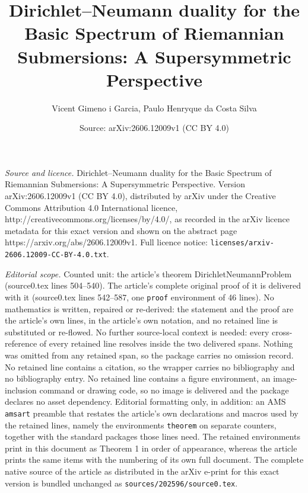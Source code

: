 \documentclass[10pt,a4paper]{amsart}
\title{Dirichlet--Neumann duality for the Basic Spectrum of Riemannian Submersions: A Supersymmetric Perspective}
\author{Vicent Gimeno i Garcia, Paulo Henryque da Costa Silva}
\date{Source: arXiv:2606.12009v1 (CC BY 4.0)}
\begin{document}
\maketitle

\noindent\emph{Source and licence.} Dirichlet--Neumann duality for the Basic Spectrum of Riemannian Submersions: A Supersymmetric Perspective. Version arXiv:2606.12009v1 (CC BY 4.0), distributed by arXiv under the Creative Commons Attribution 4.0 International licence, http://creativecommons.org/licenses/by/4.0/, as recorded in the arXiv licence metadata for this exact version and shown on the abstract page https://arxiv.org/abs/2606.12009v1. Full licence notice: \texttt{licenses/arxiv-2606.12009-CC-BY-4.0.txt}.\par\smallskip

\noindent\textit{Editorial scope.} Counted unit: the article's theorem DirichletNeumannProblem (source0.tex lines 504--540). The article's complete original proof of it is delivered with it (source0.tex lines 542--587, one \texttt{proof} environment of 46 lines). No mathematics is written, repaired or re-derived: the statement and the proof are the article's own lines, in the article's own notation, and no retained line is substituted or re-flowed.  No further source-local context is needed: every cross-reference of every retained line resolves inside the two delivered spans.  Nothing was omitted from any retained span, so the package carries no omission record.  No retained line contains a citation, so the wrapper carries no bibliography and no bibliography entry.  No retained line contains a figure environment, an image-inclusion command or drawing code, so no image is delivered and the package declares no asset dependency.  Editorial formatting only, in addition: an AMS \texttt{amsart} preamble that restates the article's own declarations and macros used by the retained lines, namely the environments \texttt{theorem} on separate counters, together with the standard packages those lines need.  The retained environments print in this document as Theorem 1 in order of appearance, whereas the article prints the same items with the numbering of its own full document.  The complete native source of the article as distributed in the arXiv e-print for this exact version is bundled unchanged as \texttt{sources/202596/source0.tex}.
\end{document}
